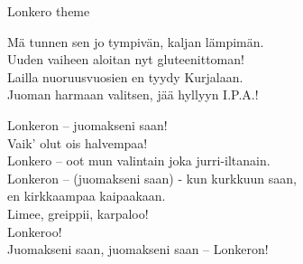 \begin{song}{Lonkero theme}


    Mä tunnen sen jo tympivän, kaljan lämpimän.\\
    Uuden vaiheen aloitan nyt gluteenittoman!\\
    Lailla nuoruusvuosien en tyydy Kurjalaan.\\
    Juoman harmaan valitsen, jää hyllyyn I.P.A.!

    Lonkeron – juomakseni saan!\\
    Vaik’ olut ois halvempaa!\\
    Lonkero – oot mun valintain joka jurri-iltanain.\\
    Lonkeron – (juomakseni saan) - kun kurkkuun saan,\\
    en kirkkaampaa kaipaakaan.\\
    Limee, greippii, karpaloo!\\
    Lonkeroo! \\
    Juomakseni saan, juomakseni saan – Lonkeron!

\end{song}
